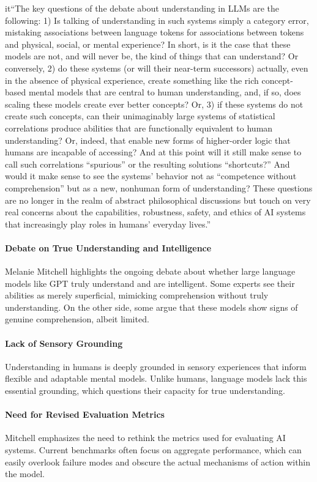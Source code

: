 it{``The key questions of the debate about understanding in LLMs are the following: 1) Is talking of understanding in such systems simply a category error, mistaking associations between language tokens for associations between tokens and physical, social, or mental experience? In short, is it the case that these models are not, and will never be, the kind of things that can understand? Or conversely, 2) do these systems (or will their near-term successors) actually, even in the absence of physical experience, create something like the rich concept-based mental models that are central to human understanding, and, if so, does scaling these models create ever better concepts? Or, 3) if these systems do not create such concepts, can their unimaginably large systems of statistical correlations produce abilities that are functionally equivalent to human understanding? Or, indeed, that enable new forms of higher-order logic that humans are incapable of accessing? And at this point will it still make sense to call such correlations “spurious” or the resulting solutions “shortcuts?” And would it make sense to see the systems’ behavior not as “competence without comprehension” but as a new, nonhuman form of understanding? These questions are no longer in the realm of abstract philosophical discussions but touch on very real concerns about the capabilities, robustness, safety, and ethics of AI systems that increasingly play roles in humans’ everyday lives.''}

\paragraph{Debate on True Understanding and Intelligence}
Melanie Mitchell highlights the ongoing debate about whether large language models like GPT truly understand and are intelligent. Some experts see their abilities as merely superficial, mimicking comprehension without truly understanding. On the other side, some argue that these models show signs of genuine comprehension, albeit limited.

\paragraph{Lack of Sensory Grounding}
Understanding in humans is deeply grounded in sensory experiences that inform flexible and adaptable mental models. Unlike humans, language models lack this essential grounding, which questions their capacity for true understanding.

\paragraph{Need for Revised Evaluation Metrics}
Mitchell emphasizes the need to rethink the metrics used for evaluating AI systems. Current benchmarks often focus on aggregate performance, which can easily overlook failure modes and obscure the actual mechanisms of action within the model.

